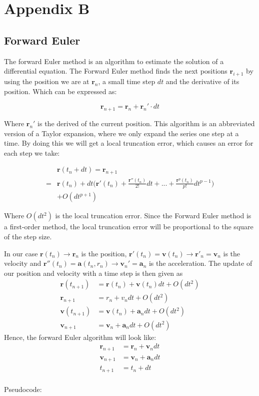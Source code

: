 \documentclass{article}
\begin{document}
\section{Appendix B} %
\subsection{Forward Euler}
The forward Euler method is an algorithm to estimate the solution of a differential equation. The Forward Euler method  finds the next positions $\mathbf{r}_{i+1}$ by using the position we are at $\mathbf{r}_{n}$, a small time step $dt$ and the derivative of its position. Which can be expressed as:

\begin{equation}
\mathbf{r}_{n+1}=\mathbf{r}_n + \mathbf{r}_n'\cdot dt
\label{eq:yn1}
\end{equation}

Where $\mathbf{r}_n'$ is the derived of the current position. This algorithm is an abbreviated version of a Taylor expansion, where we only expand the series one step at a time. By doing this we will get a local truncation error, which causes an error for each step we take:

\begin{equation}
\begin{split}
&\mathbf{r}(t_n+dt)=\mathbf{r}_{n+1}\\
=&\mathbf{r}(t_n)+dt\bigg(\mathbf{r}'(t_n) + \frac{\mathbf{r}''(t_n)}{2!}dt + ... + \frac{\mathbf{r}^p(t_n)}{p!}dt^{p-1}\bigg) \\
&+ O(dt^{p+1})
\end{split}
\label{eq:ytndt}
\end{equation} 

Where $O(dt^2)$ is the local truncation error. Since the Forward Euler method is a first-order method, the local truncation error will be proportional to the square of the step size.

In our case $\mathbf{r}(t_n) \rightarrow \mathbf{r}_n$ is the position, $\mathbf{r}'(t_n)=\mathbf{v}(t_n) \rightarrow \mathbf{r}'_n=\mathbf{v}_n$ is the velocity and $\mathbf{r}''(t_n)=\mathbf{a}(t_n,r_n) \rightarrow \mathbf{v}_n'=\mathbf{a}_n$ is the acceleration. The update of our position and velocity with a  time step is then given as  
\begin{align*}
    \mathbf{r}(t_{n+1})&=\mathbf{r}(t_n) + \mathbf{v}(t_n)dt + O(dt^2)\\
    \mathbf{r}_{n+1}&=r_{n} + v_{n}dt + O(dt^2)\\
    \mathbf{v}(t_{n+1})&=\mathbf{v}(t_n)+\mathbf{a}_ndt + O(dt^2)\\
    \mathbf{v}_{n+1}&=\mathbf{v}_n +\mathbf{a}_n dt + O(dt^2)
\end{align*}
Hence, the forward Euler algorithm will look like:
\begin{align*}
    \mathbf{r}_{n+1}&=\mathbf{r}_n+\mathbf{v}_ndt\\
    \mathbf{v}_{n+1}&=\mathbf{v}_n+\mathbf{a}_ndt\\
    t_{n+1}&=t_n + dt
\end{align*}
\\
Pseudocode:
\end{document}
